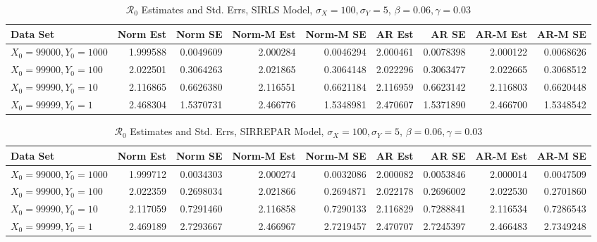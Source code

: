 \documentclass[12pt]{article}
\newcommand{\rr}{\ensuremath{\mathcal{R}_0}}
\begin{document}
\begin{table}[H]
	
	\caption{\label{tab:}$\rr$ Estimates and Std. Errs, SIRLS Model,
		$\sigma_X = 100, \sigma_Y = 5$, $\beta = 0.06, \gamma = 0.03$}
	\centering
	\begin{footnotesize}
	\begin{tabular}[t]{l|r|r|r|r|r|r|r|r}
		\hline
		Data Set & Norm Est & Norm SE & Norm-M Est & Norm-M SE & AR Est & AR SE & AR-M Est & AR-M SE\\
		\hline
		$X_0 = 99000, Y_0 = 1000$ & 1.999588 & 0.0049609 & 2.000284 & 0.0046294 & 2.000461 & 0.0078398 & 2.000122 & 0.0068626\\
		\hline
		$X_0 = 99900, Y_0 = 100$ & 2.022501 & 0.3064263 & 2.021865 & 0.3064148 & 2.022296 & 0.3063477 & 2.022665 & 0.3068512\\
		\hline
		$X_0 = 99990, Y_0 = 10$ & 2.116865 & 0.6626380 & 2.116551 & 0.6621184 & 2.116959 & 0.6623142 & 2.116803 & 0.6620448\\
		\hline
		$X_0 = 99999, Y_0 = 1$ & 2.468304 & 1.5370731 & 2.466776 & 1.5348981 & 2.470607 & 1.5371890 & 2.466700 & 1.5348542\\
		\hline
	\end{tabular}
\end{footnotesize}
\end{table}
\begin{table}[H]
	
	\caption{\label{tab:}$\rr$ Estimates and Std. Errs, SIRREPAR Model,
		$\sigma_X = 100, \sigma_Y = 5$, $\beta = 0.06, \gamma = 0.03$}
	\centering
	\begin{footnotesize}
	\begin{tabular}[t]{l|r|r|r|r|r|r|r|r}
		\hline
		Data Set & Norm Est & Norm SE & Norm-M Est & Norm-M SE & AR Est & AR SE & AR-M Est & AR-M SE\\
		\hline
		$X_0 = 99000, Y_0 = 1000$ & 1.999712 & 0.0034303 & 2.000274 & 0.0032086 & 2.000082 & 0.0053846 & 2.000014 & 0.0047509\\
		\hline
		$X_0 = 99900, Y_0 = 100$ & 2.022359 & 0.2698034 & 2.021866 & 0.2694871 & 2.022178 & 0.2696002 & 2.022530 & 0.2701860\\
		\hline
		$X_0 = 99990, Y_0 = 10$ & 2.117059 & 0.7291460 & 2.116858 & 0.7290133 & 2.116829 & 0.7288841 & 2.116534 & 0.7286543\\
		\hline
		$X_0 = 99999, Y_0 = 1$  & 2.469189 & 2.7293667 & 2.466967 & 2.7219457 & 2.470707 & 2.7245397 & 2.466483 & 2.7349248\\
		\hline
	\end{tabular}
\end{footnotesize}
\end{table}
\end{document}
